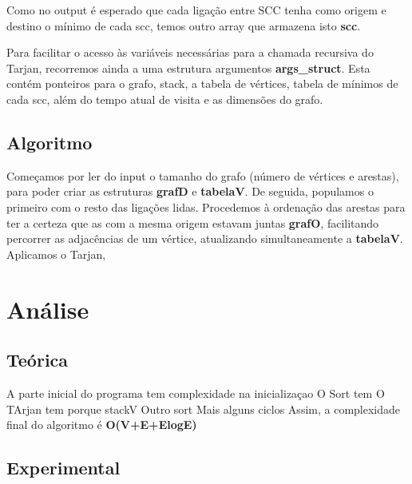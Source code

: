 \documentclass[12pt,a4paper]{article}
\begin{document}
Como no output é esperado que cada ligação entre SCC tenha como origem e destino o mínimo de cada scc, temos outro array que armazena isto \textbf{scc}.

Para facilitar o acesso às variáveis necessárias para a chamada recursiva do Tarjan, recorremos ainda a uma estrutura argumentos \textbf{args\_struct}. Esta contém ponteiros para o grafo, stack, a tabela de vértices, tabela de mínimos de cada scc, além do tempo atual de visita e as dimensões do grafo.
\subsection{Algoritmo}
Começamos por ler do input o tamanho do grafo (número de vértices e arestas), para poder criar as estruturas \textbf{grafD} e \textbf{tabelaV}. De seguida, populamos o primeiro com o resto das ligações lidas.
Procedemos à ordenação das arestas para ter a certeza que as com a mesma origem estavam juntas \textbf{grafO}, facilitando percorrer as adjacências de um vértice, atualizando simultaneamente a \textbf{tabelaV}.
Aplicamos o Tarjan,

\section{Análise}
\subsection{Teórica}
A parte inicial do programa tem complexidade na inicializaçao
O Sort tem 
O TArjan tem porque stackV
Outro sort
Mais alguns ciclos
Assim, a complexidade final do algoritmo é \textbf{O(V+E+ElogE)}

\subsection{Experimental}
\end{document}
